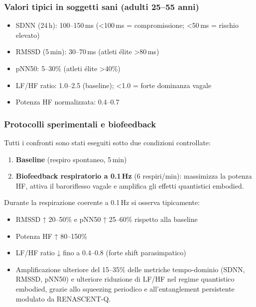 \documentclass[11pt,a4paper]{article}
\theoremstyle{plain}
\theoremstyle{definition}
\begin{document}
\vspace{0.4cm}

\subsubsection{Valori tipici in soggetti sani (adulti 25--55 anni)}

\vspace{0.2cm}

\begin{itemize}
    \item SDNN (24\,h): 100--150\,ms (<100\,ms = compromissione; <50\,ms = rischio elevato)
    \item RMSSD (5\,min): 30--70\,ms (atleti élite >80\,ms)
    \item pNN50: 5--30\% (atleti élite >40\%)
    \item LF/HF ratio: 1.0--2.5 (baseline); <1.0 = forte dominanza vagale
    \item Potenza HF normalizzata: 0.4--0.7
\end{itemize}


\vspace{0.4cm}

\subsubsection{Protocolli sperimentali e biofeedback}

\vspace{0.2cm}

Tutti i confronti sono stati eseguiti sotto due condizioni controllate:

\vspace{0.2cm}


\begin{enumerate}
    \item \textbf{Baseline} (respiro spontaneo, 5\,min)
    \item \textbf{Biofeedback respiratorio a 0.1\,Hz} (6 respiri/min): massimizza la potenza HF, attiva il baroriflesso vagale e amplifica gli effetti quantistici embodied.
\end{enumerate}

\vspace{0.3cm}

Durante la respirazione coerente a 0.1\,Hz si osserva tipicamente:
\begin{itemize}
    \item RMSSD ↑ 20--50\% e pNN50 ↑ 25--60\% rispetto alla baseline
    \item Potenza HF ↑ 80--150\%
    \item LF/HF ratio ↓ fino a 0.4--0.8 (forte shift parasimpatico)
    \item Amplificazione ulteriore del 15--35\% delle metriche tempo-dominio (SDNN, RMSSD, pNN50) e ulteriore riduzione di LF/HF nel regime quantistico embodied, grazie allo squeezing periodico e all'entanglement persistente modulato da RENASCENT-Q.
\end{itemize}
\end{document}
